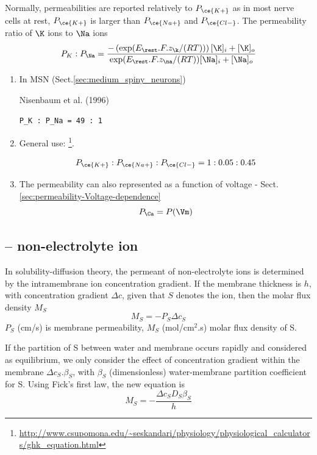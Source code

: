 Normally, permeabilities are reported relatively to $P_{\ce{K+}}$ as in
most nerve cells at rest, $P_{\ce{K+}}$ is larger than $P_{\ce{Na+}}$ and
$P_{\ce{Cl-}}$. The permeability ratio of $\K$ ions to $\Na$ ions
\begin{equation}
P_K : P_\Na = \frac{-\left( \exp( E_\rest .F .z_\k / (RT)) \right) [\K]_i +
[\K]_o}{ \exp( E_\rest .F .z_\na / (RT)) [\Na]_i + [\Na]_o}
\end{equation}
\begin{enumerate}
  \item In MSN (Sect.\ref{sec:medium_spiny_neurons})

Nisenbaum et al. (1996)
\begin{verbatim}
P_K : P_Na = 49 : 1
\end{verbatim}

  \item General use:
  \footnote{\url{http://www.csupomona.edu/~seskandari/physiology/physiological_calculators/ghk_equation.html}}.

  \begin{eqnarray}
    \label{eq:539}
    P_{\ce{K+}}:P_{\ce{Na+}}:P_{\ce{Cl-}} = 1:0.05:0.45
  \end{eqnarray}

  \item The permeability can also represented as a function of voltage -
  Sect.\ref{sec:permeability-Voltage-dependence}
  \label{sec:GHK-Ca2+}
\begin{equation}
P_\Ca = P(\Vm)
\end{equation}
\end{enumerate}

\subsection{-- non-electrolyte ion}
\label{sec:permeability-non-electrolyte-ion}

In solubility-diffusion theory, the permeant of non-electrolyte ions is
determined by the intramembrane ion concentration gradient. If the membrane
thickness is $h$, with concentration gradient $\Delta c$, given that $S$ denotes
the ion, then the molar flux density $M_S$
\begin{equation}
M_S = -P_S \Delta c_S
\end{equation}
$P_S$ (cm/s) is membrane permeability, $M_S$ (mol/cm$^2$.s) molar flux density
of S.

If the partition of S between water and membrane occurs rapidly and considered
as equilibrium, we only consider the effect of concentration gradient within the
membrane $\Delta c_S.\beta_S$, with $\beta_S$ (dimensionless) water-membrane
partition coefficient for S. Using Fick's first law, the new equation is
\begin{equation}
M_S = - \frac{\Delta c_S D_S \beta_S}{h}
\end{equation}

